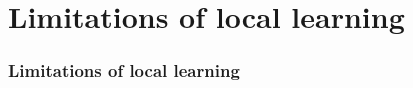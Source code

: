 \section{Limitations of local learning}

\begin{frame}
	\frametitle{Limitations of local learning}
\end{frame}
